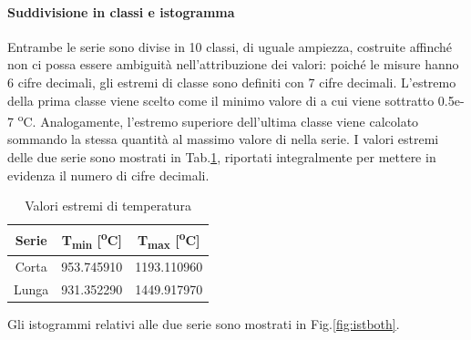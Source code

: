 \paragraph{Suddivisione in classi e istogramma}
Entrambe le serie sono divise in 10 classi, di uguale ampiezza, costruite affinché non ci possa essere ambiguità nell'attribuzione dei valori: poiché le misure hanno 6 cifre decimali, gli estremi di classe sono definiti con 7 cifre decimali. L'estremo della prima classe viene scelto come il minimo valore di  a cui viene sottratto 0.5e-7 \textsuperscript{o}C. Analogamente, l'estremo superiore dell'ultima classe viene calcolato sommando la stessa quantità al massimo valore di  nella serie. I valori estremi delle due serie sono mostrati in Tab.\ref{tab:estremitemp}, riportati integralmente per mettere in evidenza il numero di cifre decimali.
\begin{table} [H]
	\centering
	\begin{tabular}{c|c|c}
		\toprule
		\toprule
		\textbf{Serie} & \textbf{T\textsubscript{min} [\textsuperscript{o}C]} &\textbf{T\textsubscript{max} [\textsuperscript{o}C]} \\
		\midrule
		\midrule
		Corta & 953.745910 & 1193.110960\\
		\midrule
		Lunga & 931.352290 & 1449.917970 \\
		\bottomrule
		\bottomrule
	\end{tabular}
\caption{Valori estremi di temperatura}
\label{tab:estremitemp}
\end{table}
Gli istogrammi relativi alle due serie sono mostrati in Fig.\ref{fig:istboth}.
